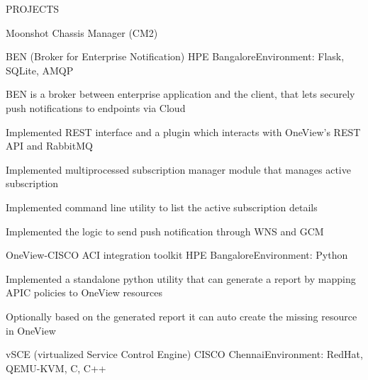 \documentclass{resume} %
\begin{document}
\begin{rSection}{PROJECTS}
\begin{rSubsection}{Moonshot Chassis Manager (CM2)}
\end{rSubsection}


\begin{rSubsection}{BEN (Broker for Enterprise Notification)}
{HPE Bangalore}{Environment: Flask, SQLite, AMQP}{ }  %

\vspace{-3pt}

\item BEN is a broker between enterprise application and the client, that lets securely push notifications to endpoints via Cloud
\item Implemented REST interface and a plugin which interacts with OneView's REST API and RabbitMQ
\item Implemented multiprocessed subscription manager module that manages active subscription
\item Implemented command line utility to list the active subscription details
\item Implemented the logic to send push notification through WNS and GCM

\end{rSubsection}


\begin{rSubsection}{OneView-CISCO ACI integration toolkit}
{HPE Bangalore}{Environment: Python}{ }  %

\vspace{-3pt}

\item Implemented a standalone python utility that can generate a report by mapping APIC policies to OneView resources 
\item Optionally based on the generated report it can auto create the missing resource in OneView

\end{rSubsection}


\begin{rSubsection}{vSCE (virtualized Service Control Engine)}
{CISCO Chennai}{Environment: RedHat, QEMU-KVM, C, C++}{ }  %


\end{rSubsection}
\end{rSection}
\end{document}
